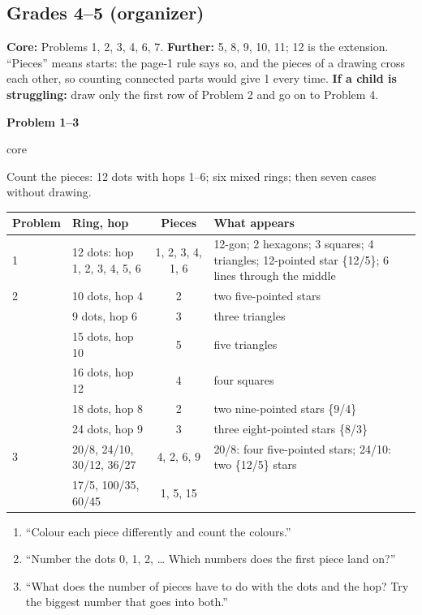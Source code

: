 \documentclass[11pt]{article}
\newcommand{\lbl}[1]{\colorbox{black!10}{\footnotesize\strut #1}}
\newcommand{\core}{\lbl{core}}
\newcommand{\pb}[3]{\par\needspace{4\baselineskip}\vspace{3pt}\noindent\textbf{Problem #1}\enspace #2\enspace #3\par}
\newenvironment{hints}{\begin{enumerate}[label={\textit{Hint \arabic*.}}, leftmargin=*, align=left]}{\end{enumerate}}
\begin{document}
\subsection{Grades 4--5 (organizer)}
\textbf{Core:} Problems 1, 2, 3, 4, 6, 7. \textbf{Further:} 5, 8, 9, 10, 11; 12 is the extension. ``Pieces''
means starts: the page-1 rule says so, and the pieces of a drawing cross each other, so counting connected parts
would give 1 every time. \textbf{If a child is struggling:} draw only the first row of Problem 2 and go on to
Problem 4.

\pb{1--3}{\core}{Count the pieces: 12 dots with hops 1--6; six mixed rings; then seven cases without drawing.}

{\small\begin{tabularx}{\textwidth}{@{}l l c L@{}}
\toprule
Problem & Ring, hop & Pieces & What appears \\
 & 12 dots: hop 1, 2, 3, 4, 5, 6 & 1, 2, 3, 4, 1, 6 & 12-gon; 2 hexagons; 3 squares; 4 triangles; 12-pointed star \{12/5\}; 6 lines through the middle \\
2 & 10 dots, hop 4 & 2 & two five-pointed stars \\
  & 9 dots, hop 6 & 3 & three triangles \\
  & 15 dots, hop 10 & 5 & five triangles \\
  & 16 dots, hop 12 & 4 & four squares \\
  & 18 dots, hop 8 & 2 & two nine-pointed stars \{9/4\} \\
  & 24 dots, hop 9 & 3 & three eight-pointed stars \{8/3\} \\
3 & 20/8, 24/10, 30/12, 36/27 & 4, 2, 6, 9 & 20/8: four five-pointed stars; 24/10: two \{12/5\} stars \\
  & 17/5, 100/35, 60/45 & 1, 5, 15 & \\
\bottomrule
\end{tabularx}}
\begin{hints}
\item ``Colour each piece differently and count the colours.''
\item ``Number the dots 0, 1, 2, \dots{} Which numbers does the first piece land on?''
\item ``What does the number of pieces have to do with the dots and the hop? Try the biggest number that goes
  into both.''
\end{hints}
\end{document}

